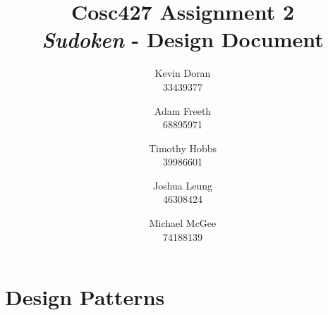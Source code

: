 \documentclass[a4paper, 11pt]{article}
\title{\textbf{Cosc427 Assignment 2} \\ {\textit{Sudoken} - Design Document}}
\author{
	Kevin Doran    \\ 33439377 \and
	Adam Freeth    \\ 68895971 \and
	Timothy Hobbs  \\ 39986601 \and
	Joshua Leung   \\ 46308424 \and
	Michael McGee  \\ 74188139
}
\begin{document}
\maketitle


\section{Design Patterns}
\end{document}
